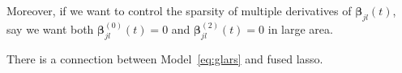 \documentclass[11pt]{article}
\newcommand{\bbeta}{{\boldsymbol{\beta}}}
\begin{document}
Moreover, if we want to control the sparsity of multiple derivatives of $\bbeta_{jl}(t)$, say we want both $\bbeta_{jl}^{(0)}(t) = 0$ and $\bbeta_{jl}^{(2)}(t) = 0$ in large area.

There is a connection between Model~\ref{eq:glars} and fused lasso.



\end{document}
